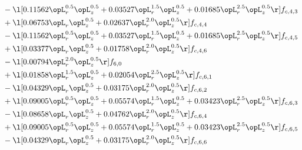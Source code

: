 \begin{alignat}{2}
& - \l[  0.11562 \opL_r^{0.5} \opL_z^{0.5} +  0.03527 \opL_r^{1.5} \opL_z^{0.5} +  0.01685 \opL_r^{2.5} \opL_z^{0.5}  \r] f_{c,4,3} \nonumber \\ 
& + \l[  0.06753 \opL_r \opL_z^{0.5} +  0.02637 \opL_r^{2.0} \opL_z^{0.5}  \r] f_{c,4,4} \nonumber \\ 
& - \l[  0.11562 \opL_r^{0.5} \opL_z^{0.5} +  0.03527 \opL_r^{1.5} \opL_z^{0.5} +  0.01685 \opL_r^{2.5} \opL_z^{0.5}  \r] f_{c,4,5} \nonumber \\ 
& + \l[  0.03377 \opL_r \opL_z^{0.5} +  0.01758 \opL_r^{2.0} \opL_z^{0.5}  \r] f_{c,4,6} \nonumber \\ 
& - \l[  0.00794 \opL_r^{2.0} \opL_z^{0.5}  \r] f_{6,0} \nonumber \\ 
& + \l[  0.01858 \opL_r^{1.5} \opL_z^{0.5} +  0.02054 \opL_r^{2.5} \opL_z^{0.5}  \r] f_{c,6,1} \nonumber \\ 
& - \l[  0.04329 \opL_r \opL_z^{0.5} +  0.03175 \opL_r^{2.0} \opL_z^{0.5}  \r] f_{c,6,2} \nonumber \\ 
& + \l[  0.09005 \opL_r^{0.5} \opL_z^{0.5} +  0.05574 \opL_r^{1.5} \opL_z^{0.5} +  0.03423 \opL_r^{2.5} \opL_z^{0.5}  \r] f_{c,6,3} \nonumber \\ 
& - \l[  0.08658 \opL_r \opL_z^{0.5} +  0.04762 \opL_r^{2.0} \opL_z^{0.5}  \r] f_{c,6,4} \nonumber \\ 
& + \l[  0.09005 \opL_r^{0.5} \opL_z^{0.5} +  0.05574 \opL_r^{1.5} \opL_z^{0.5} +  0.03423 \opL_r^{2.5} \opL_z^{0.5}  \r] f_{c,6,5} \nonumber \\ 
& - \l[  0.04329 \opL_r \opL_z^{0.5} +  0.03175 \opL_r^{2.0} \opL_z^{0.5}  \r] f_{c,6,6} \nonumber \\ 
\end{alignat} 


